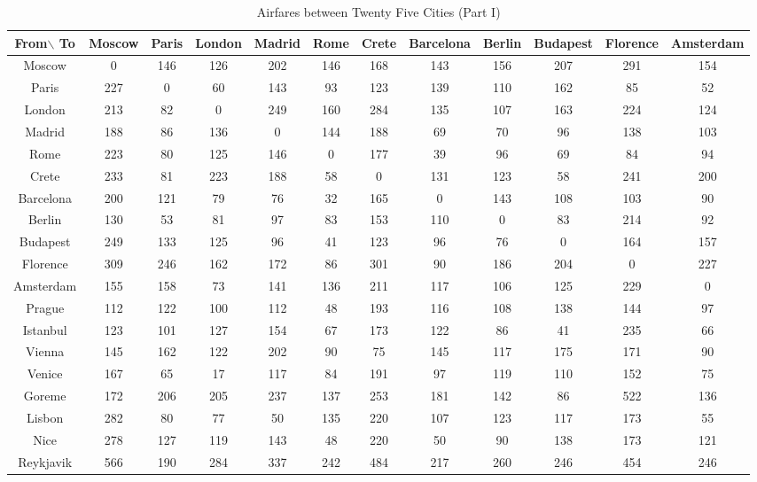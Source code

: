 \documentclass[12pt]{article}
\begin{document}
\begin{landscape}
\pagebreak
\begin{table}[h]
\caption{Airfares between Twenty Five Cities (Part I)}
\centering
\vspace{1mm}
\begin{tabular}{c|c|c|c|c|c|c|c|c|c|c|c}
\hline
\rule{0pt}{2ex} From$\backslash$ To & Moscow & Paris & London & Madrid & Rome & Crete & Barcelona & Berlin & Budapest & Florence & Amsterdam   \\
\hline
\rule{0pt}{2ex}Moscow & 0 & 146 & 126 & 202 & 146 & 168 & 143 & 156 & 207 & 291 & 154 \\
Paris & 227 & 0 & 60 & 143 & 93 & 123 & 139 & 110 & 162 & 85 & 52  \\
London & 213 & 82 & 0 & 249 & 160 & 284 & 135 & 107 & 163 & 224 & 124  \\
Madrid & 188 & 86 & 136 & 0 & 144 & 188 & 69 & 70 & 96 & 138 & 103  \\
Rome & 223 & 80 & 125 & 146 & 0 & 177 & 39 & 96 & 69 & 84 & 94  \\
Crete & 233 & 81 & 223 & 188 & 58 & 0 & 131 & 123 & 58 & 241 & 200 \\
Barcelona & 200 & 121 & 79 & 76 & 32 & 165 & 0 & 143 & 108 & 103 & 90 \\
Berlin & 130 & 53 & 81 & 97 & 83 & 153 & 110 & 0 & 83 & 214 & 92 \\
Budapest & 249 & 133 & 125 & 96 & 41 & 123 & 96 & 76 & 0 & 164 & 157 \\
Florence & 309 & 246 & 162 & 172 & 86 & 301 & 90 & 186 & 204 & 0 & 227 \\
Amsterdam & 155 & 158 & 73 & 141 & 136 & 211 & 117 & 106 & 125 & 229 & 0 \\
Prague & 112 & 122 & 100 & 112 & 48 & 193 & 116 & 108 & 138 & 144 & 97 \\
Istanbul & 123 & 101 & 127 & 154 & 67 & 173 & 122 & 86 & 41 & 235 & 66 \\
Vienna & 145 & 162 & 122 & 202 & 90 & 75 & 145 & 117 & 175 & 171 & 90 \\
Venice & 167 & 65 & 17 & 117 & 84 & 191 & 97 & 119 & 110 & 152 & 75 \\
Goreme & 172 & 206 & 205 & 237 & 137 & 253 & 181 & 142 & 86 & 522 & 136 \\
Lisbon & 282 & 80 & 77 & 50 & 135 & 220 & 107 & 123 & 117 & 173 & 55 \\
Nice & 278 & 127 & 119 & 143 & 48 & 220 & 50 & 90 & 138 & 173 & 121 \\
Reykjavik & 566 & 190 & 284 & 337 & 242 & 484 & 217 & 260 & 246 & 454 & 246 \\

\end{tabular}
\end{table}
\end{landscape}
\end{document}
